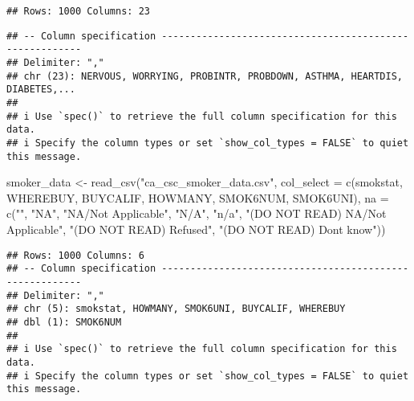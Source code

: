 \documentclass[
]{article}
\newenvironment{Shaded}{\begin{snugshade}}{\end{snugshade}}
\newcommand{\AttributeTok}[1]{\textcolor[rgb]{0.77,0.63,0.00}{#1}}
\newcommand{\FunctionTok}[1]{\textcolor[rgb]{0.00,0.00,0.00}{#1}}
\newcommand{\NormalTok}[1]{#1}
\newcommand{\OtherTok}[1]{\textcolor[rgb]{0.56,0.35,0.01}{#1}}
\newcommand{\StringTok}[1]{\textcolor[rgb]{0.31,0.60,0.02}{#1}}
\begin{document}
\begin{verbatim}
## Rows: 1000 Columns: 23
\end{verbatim}

\begin{verbatim}
## -- Column specification --------------------------------------------------------
## Delimiter: ","
## chr (23): NERVOUS, WORRYING, PROBINTR, PROBDOWN, ASTHMA, HEARTDIS, DIABETES,...
## 
## i Use `spec()` to retrieve the full column specification for this data.
## i Specify the column types or set `show_col_types = FALSE` to quiet this message.
\end{verbatim}

\begin{Shaded}
\begin{Highlighting}[]
\NormalTok{smoker\_data }\OtherTok{\textless{}{-}} \FunctionTok{read\_csv}\NormalTok{(}\StringTok{"ca\_csc\_smoker\_data.csv"}\NormalTok{,}
            \AttributeTok{col\_select =} \FunctionTok{c}\NormalTok{(smokstat, WHEREBUY, BUYCALIF,}
\NormalTok{                           HOWMANY, SMOK6NUM, SMOK6UNI),}
            \AttributeTok{na =} \FunctionTok{c}\NormalTok{(}\StringTok{""}\NormalTok{, }\StringTok{"NA"}\NormalTok{, }\StringTok{"NA/Not Applicable"}\NormalTok{, }\StringTok{"N/A"}\NormalTok{, }\StringTok{"n/a"}\NormalTok{,}
                   \StringTok{"(DO NOT READ) NA/Not Applicable"}\NormalTok{,}
                   \StringTok{"(DO NOT READ) Refused"}\NormalTok{,}
                   \StringTok{"(DO NOT READ) Don\textquotesingle{}t know"}\NormalTok{))}
\end{Highlighting}
\end{Shaded}

\begin{verbatim}
## Rows: 1000 Columns: 6
## -- Column specification --------------------------------------------------------
## Delimiter: ","
## chr (5): smokstat, HOWMANY, SMOK6UNI, BUYCALIF, WHEREBUY
## dbl (1): SMOK6NUM
## 
## i Use `spec()` to retrieve the full column specification for this data.
## i Specify the column types or set `show_col_types = FALSE` to quiet this message.
\end{verbatim}
\end{document}
